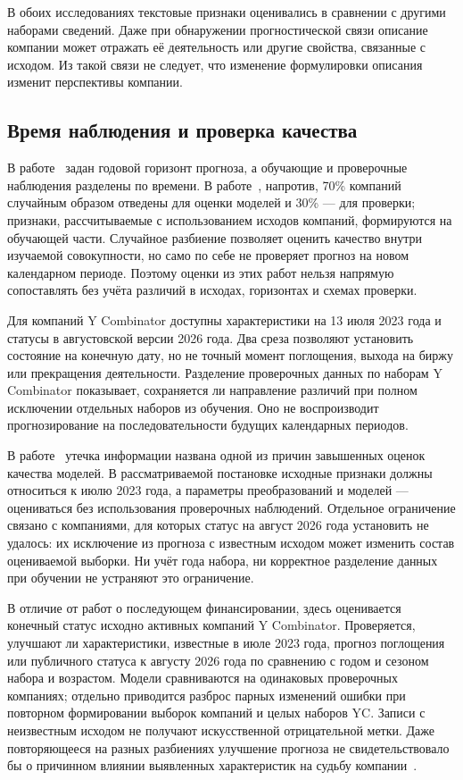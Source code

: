 В обоих исследованиях текстовые признаки оценивались в сравнении с другими наборами сведений. Даже при обнаружении прогностической связи описание компании может отражать её деятельность или другие свойства, связанные с исходом. Из такой связи не следует, что изменение формулировки описания изменит перспективы компании.

\subsection{Время наблюдения и проверка качества}

В работе~\cite{sharchilev2018} задан годовой горизонт прогноза, а обучающие и проверочные наблюдения разделены по времени. В работе~\cite{kaiser2020working}, напротив, 70\% компаний случайным образом отведены для оценки моделей и 30\% --- для проверки; признаки, рассчитываемые с использованием исходов компаний, формируются на обучающей части. Случайное разбиение позволяет оценить качество внутри изучаемой совокупности, но само по себе не проверяет прогноз на новом календарном периоде. Поэтому оценки из этих работ нельзя напрямую сопоставлять без учёта различий в исходах, горизонтах и схемах проверки.

Для компаний Y Combinator доступны характеристики на 13 июля 2023 года и статусы в августовской версии 2026 года. Два среза позволяют установить состояние на конечную дату, но не точный момент поглощения, выхода на биржу или прекращения деятельности. Разделение проверочных данных по наборам Y Combinator показывает, сохраняется ли направление различий при полном исключении отдельных наборов из обучения. Оно не воспроизводит прогнозирование на последовательности будущих календарных периодов.

В работе~\cite{kapoor2023} утечка информации названа одной из причин завышенных оценок качества моделей. В рассматриваемой постановке исходные признаки должны относиться к июлю 2023 года, а параметры преобразований и моделей --- оцениваться без использования проверочных наблюдений. Отдельное ограничение связано с компаниями, для которых статус на август 2026 года установить не удалось: их исключение из прогноза с известным исходом может изменить состав оцениваемой выборки. Ни учёт года набора, ни корректное разделение данных при обучении не устраняют это ограничение.

В отличие от работ о последующем финансировании, здесь оценивается конечный статус исходно активных компаний Y Combinator. Проверяется, улучшают ли характеристики, известные в июле 2023 года, прогноз поглощения или публичного статуса к августу 2026 года по сравнению с годом и сезоном набора и возрастом. Модели сравниваются на одинаковых проверочных компаниях; отдельно приводится разброс парных изменений ошибки при повторном формировании выборок компаний и целых наборов YC. Записи с неизвестным исходом не получают искусственной отрицательной метки. Даже повторяющееся на разных разбиениях улучшение прогноза не свидетельствовало бы о причинном влиянии выявленных характеристик на судьбу компании~\cite{shmueli2010}.
